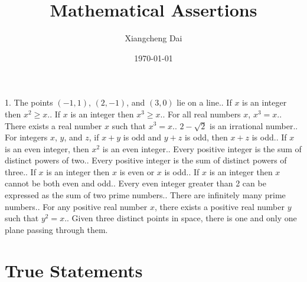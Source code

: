 \documentclass{article}
\begin{document}
\title{Mathematical Assertions}
\author{Xiangcheng Dai}
\date{\today}

\maketitle

1. The points $(-1,1)$, $(2,-1)$, and $(3,0)$ lie on a line.. If $x$ is an integer then $x^2 \geq x$.. If $x$ is an integer then $x^3 \geq x$.. For all real numbers $x$, $x^3 = x$.. There exists a real number $x$ such that $x^3 = x$.. $2 - \sqrt{2}$ is an irrational number.. For integers $x$, $y$, and $z$, if $x+y$ is odd and $y+z$ is odd, then $x+z$ is odd.. If $x$ is an even integer, then $x^2$ is an even integer.. Every positive integer is the sum of distinct powers of two.. Every positive integer is the sum of distinct powers of three.. If $x$ is an integer then $x$ is even or $x$ is odd.. If $x$ is an integer then $x$ cannot be both even and odd.. Every even integer greater than 2 can be expressed as the sum of two prime numbers.. There are infinitely many prime numbers.. For any positive real number $x$, there exists a positive real number $y$ such that $y^2 = x$.. Given three distinct points in space, there is one and only one plane passing through them.\newline

\section{True Statements}
\end{document}
